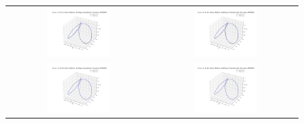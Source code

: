 \documentclass[a4paper]{article}
\begin{document}
\begin{sloppypar}
\begin{figure}[H]
  \centering
  \begin{tabular}{cc}
    \includegraphics[width=0.45\textwidth]{../figure/problemE/N_10_r3_BSpline_Equidistant_PERIODIC_3D.png}  &
    \includegraphics[width=0.45\textwidth]{../figure/problemE/N_10_r3_BSpline_ChordalLength_PERIODIC_3D.png}  \\
    \includegraphics[width=0.45\textwidth]{../figure/problemE/N_40_r3_BSpline_Equidistant_PERIODIC_3D.png}  &
    \includegraphics[width=0.45\textwidth]{../figure/problemE/N_40_r3_BSpline_ChordalLength_PERIODIC_3D.png}  \\

\end{tabular}
\end{figure}
\end{sloppypar}
\end{document}

